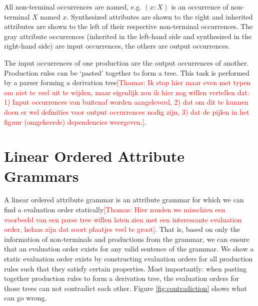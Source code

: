\documentclass{llncs}
\newif\iffinal\finalfalse
\newcommand{\REM}[3]{\iffinal\else\textcolor{#2}{[#1: #3]}\fi}
\newcommand{\Thomas}[1]{\REM{Thomas}{red}{#1}}
\begin{document}

All non-terminal occurrences are named, e.g. $(x:X)$ is an occurrence of 
non-terminal $X$ named $x$. Synthesized attributes are shown to the right
and inherited attributes are shown to the left of their respective
non-terminal occurrences. The gray attribute occurrences (inherited in the
left-hand side and synthesized in the right-hand side) are input occurrences,
the others are output occurrences. 

The input occurrences of one production are the output occurrences of another.
Production rules can be `pasted' together to form a tree\cite{knuth68}. 
This task is performed by a parser forming a derivation 
tree\Thomas{Ik stop hier maar even met typen om 
niet te veel uit te wijden, maar eigenlijk zou ik hier nog willen vertellen
dat: 1) Input occurrences van buitenaf worden aangeleverd, 2) dat om dit
te kunnen doen er wel definities voor output occurrences nodig zijn, 
3) dat de pijlen in het figuur (omgekeerde) dependencies weergeven.}.


\section{Linear Ordered Attribute Grammars}
A linear ordered attribute grammar is an attribute grammar for which we can 
find a evaluation order statically\Thomas{Hier zouden we misschien een 
voorbeeld van een parse tree willen laten zien met een interessante 
evaluation order, helaas zijn dat soort plaatjes veel te groot}. 
That is, based on only the information of
non-terminals and productions from the grammar, we can ensure that an 
evaluation order exists for any valid sentence of the grammar.
We show a static evaluation order exists by constructing evaluation orders 
for all production rules such that they satisfy certain properties.
Most importantly: when pasting together production rules to form a 
derivation tree, the evaluation orders for those trees can not contradict 
each other. Figure \ref{fig:contradiction} shows what can go wrong.

\end{document}
